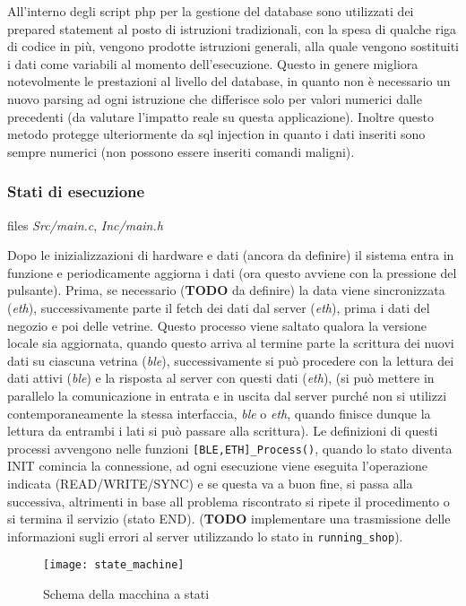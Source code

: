 All'interno degli script php per la gestione del database sono utilizzati dei prepared statement al posto di istruzioni tradizionali, con la spesa di qualche riga di codice in pi\`u, vengono prodotte istruzioni generali, alla quale vengono sostituiti i dati come variabili al momento dell'esecuzione. Questo in genere migliora notevolmente le prestazioni al livello del database, in quanto non \`e necessario un nuovo parsing ad ogni istruzione che differisce solo per valori numerici dalle precedenti (da valutare l'impatto reale su questa applicazione). Inoltre questo metodo protegge ulteriormente da sql injection in quanto i dati inseriti sono sempre numerici (non possono essere inseriti comandi maligni).

\subsubsection{Stati di esecuzione}

files \textit{Src/main.c}, \textit{Inc/main.h}

Dopo le inizializzazioni di hardware e dati (ancora da definire) il sistema entra in funzione e periodicamente aggiorna i dati (ora questo avviene con la pressione del pulsante). Prima, se necessario (\textbf{TODO} da definire) la data viene sincronizzata (\textit{eth}), successivamente parte il fetch dei dati dal server (\textit{eth}), prima i dati del negozio e poi delle vetrine. Questo processo viene saltato qualora la versione locale sia aggiornata, quando questo arriva al termine parte la scrittura dei nuovi dati su ciascuna vetrina (\textit{ble}), successivamente si pu\`o procedere con la lettura dei dati attivi (\textit{ble}) e la risposta al server con questi dati (\textit{eth}), (si pu\`o mettere in parallelo la comunicazione in entrata e in uscita dal server purch\'e non si utilizzi contemporaneamente la stessa interfaccia, \textit{ble} o \textit{eth}, quando finisce dunque la lettura da entrambi i lati si pu\`o passare alla scrittura). Le definizioni di questi processi avvengono nelle funzioni \texttt{[BLE,ETH]\_Process()}, quando lo stato diventa INIT comincia la connessione, ad ogni esecuzione viene eseguita l'operazione indicata (READ/WRITE/SYNC) e se questa va a buon fine, si passa alla successiva, altrimenti in base all problema riscontrato si ripete il procedimento o si termina il servizio (stato END). (\textbf{TODO} implementare una trasmissione delle informazioni sugli errori al server utilizzando lo stato in \texttt{running\_shop}). 

\begin{figure}
	\texttt{[image: state\_machine]}
  \caption{Schema della macchina a stati}
\end{figure}

